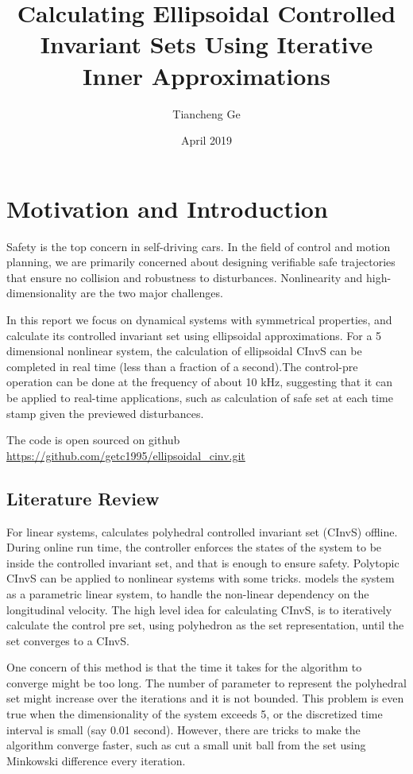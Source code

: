 \documentclass{article}
\title{Calculating Ellipsoidal Controlled Invariant Sets Using Iterative Inner Approximations}
\author{Tiancheng Ge}
\date{April 2019}
\begin{document}
\maketitle
\tableofcontents

\section{Motivation and Introduction}
Safety is the top concern in self-driving cars. In the field of control and motion planning, we are primarily concerned about designing verifiable safe trajectories that ensure no collision and robustness to disturbances. Nonlinearity and high-dimensionality are the two major challenges.

In this report we focus on dynamical systems with symmetrical properties, and calculate its controlled invariant set using ellipsoidal approximations. For a 5 dimensional nonlinear system, the calculation of ellipsoidal CInvS can be completed in real time (less than a fraction of a second).The control-pre operation can be done at the frequency of about 10 kHz, suggesting that it can be applied to real-time applications, such as calculation of safe set at each time stamp given the previewed disturbances.

The code is open sourced on github
\href{https://github.com/getc1995/ellipsoidal_cinv.git}{https://github.com/getc1995/ellipsoidal\_cinv.git}

\subsection{Literature Review}
For linear systems, \cite{correct-by-construction} calculates polyhedral controlled invariant set (CInvS) offline. During online run time, the controller enforces the states of the system to be inside the controlled invariant set, and that is enough to ensure safety. Polytopic CInvS can be applied to nonlinear systems with some tricks. \cite{lk-cinvs} models the system as a parametric linear system, to handle the non-linear dependency on the longitudinal velocity. The high level idea for calculating CInvS, is to iteratively calculate the control pre set, using polyhedron as the set representation, until the set converges to a CInvS. 

One concern of this method is that the time it takes for the algorithm to converge might be too long. The number of parameter to represent the polyhedral set might increase over the iterations and it is not bounded. This problem is even true when the dimensionality of the system exceeds 5, or the discretized time interval is small (say 0.01 second). However, there are tricks to make the algorithm converge faster, such as cut a small unit ball from the set using Minkowski difference every iteration.
\\
\end{document}
